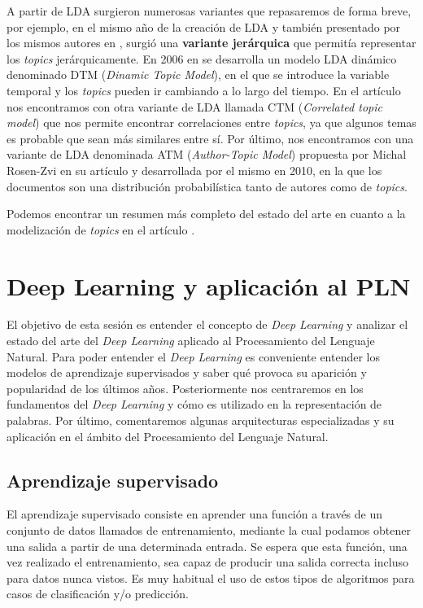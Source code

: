 A partir de LDA surgieron numerosas variantes que repasaremos de forma breve, por ejemplo, en el mismo año de la creación de LDA y también presentado por los mismos autores en \cite{Blei_HTM}, surgió una \textbf{variante jerárquica} que permitía representar los \textit{topics} jerárquicamente. En 2006 en \cite{Blei_DTM} se desarrolla un modelo LDA dinámico denominado DTM (\textit{Dinamic Topic Model}), en el que se introduce la variable temporal y los \textit{topics} pueden ir cambiando a lo largo del tiempo. En el artículo \cite{Blei_CTM} nos encontramos con otra variante de LDA llamada CTM (\textit{Correlated topic model}) que nos permite encontrar correlaciones entre \textit{topics}, ya que algunos temas es probable que sean más similares entre sí. Por último, nos encontramos con una variante de LDA denominada ATM (\textit{Author-Topic Model}) propuesta  por	Michal Rosen-Zvi en su artículo \cite{Rosen-Zvi_AMA_2010}  y desarrollada por el mismo en 2010, en la que los documentos son una distribución probabilística tanto de autores como de \textit{topics}.    


Podemos encontrar un resumen más completo del estado del arte en cuanto a la modelización de \textit{topics} en el artículo \cite{Mahmood2013LiteratureSO}. 

\section{Deep Learning  y aplicación al PLN}
\label{section:arte:deep}

El objetivo de esta sesión es entender el concepto de \textit{Deep Learning} y analizar el estado del arte del \textit{Deep Learning} aplicado al Procesamiento del Lenguaje Natural. Para poder entender el \textit{Deep Learning} es conveniente entender los modelos de aprendizaje supervisados y saber qué provoca su aparición y popularidad de los últimos años. Posteriormente nos centraremos en los fundamentos del \textit{Deep Learning} y cómo es utilizado en la representación de palabras. Por último, comentaremos algunas arquitecturas especializadas y su aplicación en el ámbito del Procesamiento del Lenguaje Natural.


\subsection{Aprendizaje supervisado}
El aprendizaje supervisado consiste en aprender una función a través de un conjunto de datos llamados de entrenamiento, mediante la cual podamos obtener una salida a partir de una determinada entrada. Se espera que esta función, una vez realizado el entrenamiento, sea capaz de producir una salida correcta incluso para datos nunca vistos. Es muy habitual el uso de estos tipos de algoritmos para casos de clasificación y/o predicción. 

